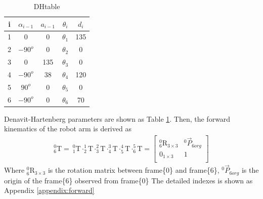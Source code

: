 \documentclass[12pt]{article}
\begin{document}
\begin{CJK}{UTF8}{bsmi}
\begin{table}[h]
\centering
\caption{DHtable}
\label{tab:DHtable}
\begin{tabular}{ccccc} 
\hline \hline
	i	&$\alpha _{i-1}$	&$a_{i-1}$	&$\theta _i$			&$d_i$	\\\hline
	1   &0    				&0			&$\theta _1$			&135 \\
	2   &$-90^{o}$   		&0			&$\theta _2$			&0 \\
	3   &0    				&135		&$\theta _3$ 			&0 \\
	4   &$-90^{o}$    		&38			&$\theta _4$ 			&120 \\
	5   &$90^{o}$    		&0			&$\theta _5$ 			&0 \\
	6   &$-90^{o}$    		&0			&$\theta _6$ 			&70 \\
\end{tabular}
\end{table}
Denavit-Hartenberg parameters are shown as Table \ref{tab:DHtable}. Then, the forward kinematics of the robot arm is derived as
\begin{equation*}
\begin{split}
^0_6\text{T} =
\ ^0_1\text{T} \cdot ^1_2\text{T} \cdot ^2_3\text{T} \cdot ^3_4\text{T} \cdot ^4_5\text{T} \cdot ^5_6\text{T} =
\begin{bmatrix}
^0_6\text{R}_{3\times 3} 	&^0\vec{P}_{6org}\\
0_{1\times 3}				&1\\
\end{bmatrix}
\end{split}
\end{equation*}
Where $^0_6\text{R}_{3\times 3}$ is the rotation matrix between frame\{0\} and frame\{6\}, $^0\vec{P}_{6org}$ is the origin of the frame\{6\} observed from frame\{0\}
The detailed indexes is shown as Appendix \ref{appendix:forward}




\end{CJK}
\end{document}

